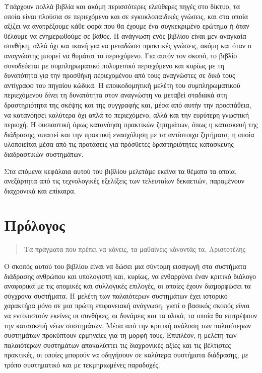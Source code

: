 \documentclass[
]{article}
\begin{document}
Υπάρχουν πολλά βιβλία και ακόμη περισσότερες ελεύθερες πηγές στο δίκτυο,
τα οποία είναι πλούσια σε περιεχόμενο και σε εγκυκλοπαιδικές γνώσεις,
και στα οποία αξίζει να ανατρέξουμε κάθε φορά που θα έχουμε ένα
συγκεκριμένο ερώτημα ή όταν θέλουμε να ενημερωθούμε σε βάθος. Η ανάγνωση
ενός βιβλίου είναι μεν αναγκαία συνθήκη, αλλά όχι και ικανή για να
μεταδώσει πρακτικές γνώσεις, ακόμη και όταν ο αναγνώστης μπορεί να
θυμάται το περιεχόμενο. Για αυτόν τον σκοπό, το βιβλίο συνοδεύεται με
συμπληρωματικό πολυμεσικό περιεχόμενο και κυρίως με τη δυνατότητα για
την προσθήκη περιεχομένου από τους αναγνώστες σε δικό τους αντίγραφο του
πηγαίου κώδικα. Η εποικοδομητική μελέτη του συμπληρωματικού περιεχόμενου
δίνει τη δυνατότητα στον αναγνώστη να μεταβεί σταδιακά στη δραστηριότητα
της σκέψης και της συγγραφής και, μέσα από αυτήν την προσπάθεια, να
κατανόησει καλύτερα όχι απλά το περιεχόμενο, αλλά και την ευρύτερη
γνωστική περιοχή. Η ουσιαστική όμως κατανόηση πρακτικών ζητημάτων, όπως
η κατασκευή της διάδρασης, απαιτεί και την πρακτική ενασχόληση με τα
αντίστοιχα ζητήματα, η οποία υλοποιείται μέσα από τις προτάσεις για
πρόσθετες δραστηριότητες κατασκευής διαδραστικών συστημάτων.

Στα επόμενα κεφάλαια αυτού του βιβλίου μελετάμε εκείνα τα θέματα τα
οποία, ανεξάρτητα από τις τεχνολογικές εξελίξεις των τελευταίων
δεκαετιών, παραμένουν διαχρονικά και επίκαιρα.

\hypertarget{ux3c0ux3c1ux3ccux3bbux3bfux3b3ux3bfux3c2}{%
\section{Πρόλογος}\label{ux3c0ux3c1ux3ccux3bbux3bfux3b3ux3bfux3c2}}

\begin{quote}
Τα πράγματα που πρέπει να κάνεις, τα μαθαίνεις κάνοντάς τα. Αριστοτέλης
\end{quote}

Ο σκοπός αυτού του βιβλίου είναι να δώσει μια σύντομη εισαγωγή στα
συστήματα διάδρασης ανθρώπου και υπολογιστή και, κυρίως, να ενθαρρύνει
έναν κριτικό διάλογο αναφορικά με τις ατομικές και συλλογικές επιλογές,
οι οποίες έχουν διαμορφώσει τα σύγχρονα συστήματα. Η μελέτη των
παλαιότερων συστημάτων έχει ιστορικό χαρακτήρα μόνο σε μια πρώτη
επιφανειακή ανάγνωση, γιατί ο βασικός σκοπός είναι να εντοπιστούν
εκείνες οι συνθήκες, οι δυνάμεις και τα υλικά, τα οποία θα επιτρέψουν
την κατασκευή νέων συστημάτων. Μέσα από την κριτική ανάλυση των
παλαιότερων συστημάτων προκύπτουν ερμηνείες για τη μορφή τους. Επιπλέον,
η μελέτη των παλαιότερων συστημάτων αποκαλύπτει τις διαχρονικές αξίες
και τις βέλτιστες πρακτικές, οι οποίες μπορούν να οδηγήσουν σε καλύτερα
συστήματα διάδρασης, με τρόπο συστηματικό και με τεκμηριωμένες
παραδοχές.
\end{document}
